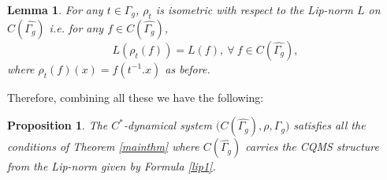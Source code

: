 \documentclass[a4paper,11pt,reqno]{amsart}
\theoremstyle{plain}
\newtheorem{lem}[thm]{Lemma}
\newtheorem{prop}[thm]{Proposition}
\theoremstyle{mainthmstyle}
\theoremstyle{named}
\numberwithin{equation}{section}
\begin{document}
\begin{lem}
For any $t\in\Gamma_g$, $\rho_t$ is isometric with respect to the Lip-norm $L$ on $C(\widehat{\Gamma_g})$ i.e. for any $f\in C(\widehat{\Gamma_g})$,
    \begin{displaymath}
        L(\rho_{t}(f))=L(f), \ \forall \ f\in C(\widehat{\Gamma_g}),
    \end{displaymath}
    where $\rho_{t}(f)(x)=f(t^{-1}.x)$ as before.
\end{lem}
Therefore, combining all these we have the following:
\begin{prop}
    The $C^{\ast}$-dynamical system $\Big(C(\widehat{\Gamma_g}),\rho,\Gamma_g)$ satisfies all the conditions of Theorem \ref{mainthm} where $C(\widehat{\Gamma_g})$ carries the CQMS structure from the Lip-norm given by Formula \ref{lip1}. 
\end{prop}
\end{document}
